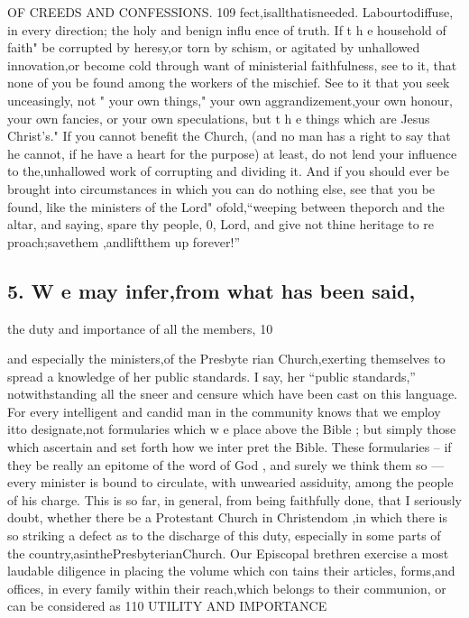 \documentclass[
]{book}
\begin{document}
OF CREEDS AND CONFESSIONS. 109
fect,isallthatisneeded. Labourtodiffuse, in every direction; the holy and benign influ ence of truth. If t h e household of faith"
be corrupted by heresy,or torn by schism, or agitated by unhallowed innovation,or become
cold through want of ministerial faithfulness,
see to it, that none of you be found among the workers of the mischief. See to it that
you seek unceasingly, not " your own things," your own aggrandizement,your own honour,
your own fancies, or your own speculations, but t h e things which are Jesus Christ's." If you cannot benefit the Church, (and no man has a right to say that he cannot, if he have a heart for the purpose) at least, do
not lend your influence to the,unhallowed
work of corrupting and dividing it. And if
you should ever be brought into circumstances
in which you can do nothing else, see that you be found, like the ministers of the
Lord" ofold,``weeping between theporch and the altar, and saying, spare thy people,
0, Lord, and give not thine heritage to re proach;savethem ,andliftthem up forever!''

\hypertarget{w-e-may-inferfrom-what-has-been-said}{%
\subsection{5. W e may infer,from what has been said,}\label{w-e-may-inferfrom-what-has-been-said}}

the duty and importance of all the members, 10

and especially the ministers,of the Presbyte
rian Church,exerting themselves to spread a knowledge of her public standards. I say,
her ``public standards,'' notwithstanding all the sneer and censure which have been cast
on this language. For every intelligent and
candid man in the community knows that we
employ itto designate,not formularies which
w e place above the Bible ; but simply those which ascertain and set forth how we inter
pret the Bible. These formularies -- if they
be really an epitome of the word of God , and
surely we think them so --- every minister is bound to circulate, with unwearied assiduity, among the people of his charge. This is so
far, in general, from being faithfully done,
that I seriously doubt, whether there be a
Protestant Church in Christendom ,in which
there is so striking a defect as to the discharge
of this duty, especially in some parts of the
country,asinthePresbyterianChurch. Our
Episcopal brethren exercise a most laudable
diligence in placing the volume which con tains their articles, forms,and offices, in every
family within their reach,which belongs to their communion, or can be considered as
110 UTILITY AND IMPORTANCE
\end{document}
